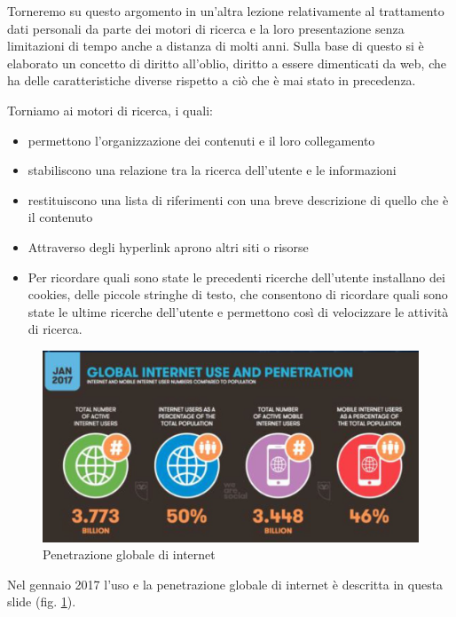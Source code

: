 Torneremo su questo argomento in un'altra lezione relativamente al trattamento dati personali da parte dei motori di ricerca e la loro presentazione senza limitazioni di tempo anche a distanza di molti anni. Sulla base di questo si è elaborato un concetto di diritto all'oblio, diritto a essere dimenticati da web, che ha delle caratteristiche diverse rispetto a ciò che è mai stato in precedenza.

Torniamo ai motori di ricerca, i quali:

\begin{itemize}
    \item permettono l'organizzazione dei contenuti e il loro collegamento
    \item stabiliscono una relazione tra la ricerca dell'utente e le informazioni
    \item restituiscono una lista di riferimenti con una breve descrizione di quello che è il contenuto
    \item Attraverso degli hyperlink aprono altri siti o risorse
    \item Per ricordare quali sono state le precedenti ricerche dell'utente installano dei cookies, delle piccole stringhe di testo, che consentono di ricordare quali sono state le ultime ricerche dell'utente e permettono così di velocizzare le attività di ricerca.
\end{itemize}


\begin{figure}[ht]
    \centering
    \includegraphics[width=1\linewidth]{images/03_lez_fig_05.jpg}
    \caption{Penetrazione globale di internet}
    \label{fig:penetrazione_globale_internet}
\end{figure}

Nel gennaio 2017 l'uso e la penetrazione globale di internet è descritta in questa slide (fig. \ref{fig:penetrazione_globale_internet}). 

